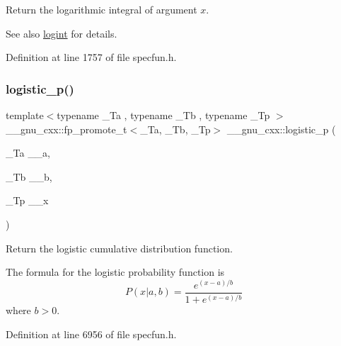 Return the logarithmic integral of argument $ x $.

\begin{DoxySeeAlso}{See also}
\hyperlink{group__gnu__math__spec__func_ga1c0fe0f4cb72041f24db82dc7e47df11}{logint} for details. 
\end{DoxySeeAlso}


Definition at line 1757 of file specfun.\+h.

\mbox{\label{group__gnu__math__spec__func_ga5a5d9c5e7ab822f84578415be8609f49}} 
\subsubsection{\texorpdfstring{logistic\+\_\+p()}{logistic\_p()}}
{\footnotesize\ttfamily template$<$typename \+\_\+\+Ta , typename \+\_\+\+Tb , typename \+\_\+\+Tp $>$ \\
\+\_\+\+\_\+gnu\+\_\+cxx\+::fp\+\_\+promote\+\_\+t$<$\+\_\+\+Ta, \+\_\+\+Tb, \+\_\+\+Tp$>$ \+\_\+\+\_\+gnu\+\_\+cxx\+::logistic\+\_\+p (\begin{DoxyParamCaption}\item[{\+\_\+\+Ta}]{\+\_\+\+\_\+a,  }\item[{\+\_\+\+Tb}]{\+\_\+\+\_\+b,  }\item[{\+\_\+\+Tp}]{\+\_\+\+\_\+x }\end{DoxyParamCaption})\hspace{0.3cm}{\ttfamily [inline]}}



Return the logistic cumulative distribution function. 

The formula for the logistic probability function is \[ P(x| a, b) = \frac{e^{(x - a)/b}}{1 + e^{(x - a)/b}} \] where $b > 0$. 

Definition at line 6956 of file specfun.\+h.

\mbox{\label{group__gnu__math__spec__func_gaeb3e768c11c8cd11804827a09f19b1e3}} 
